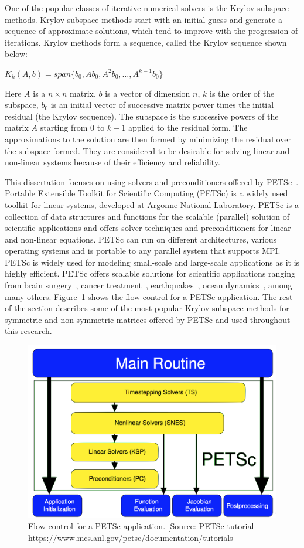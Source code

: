 One of the popular classes of iterative numerical solvers is the Krylov subspace methods. Krylov subspace methods start with an initial guess and generate a sequence of approximate solutions, which tend to improve with the progression of iterations. Krylov methods form a sequence, called the Krylov sequence shown below: 

${K}_{k}(A,b)= span\{b_0,Ab_0,A^{2}b_0,\ldots,A^{k-1}b_0\}$

Here $A$ is a $n \times n$ matrix, $b$ is a vector of dimension $n$, $k$ is the order of the subspace, $b_0$ is an initial vector of successive matrix power times the initial residual (the Krylov sequence). The subspace is the successive powers of the matrix $A$ starting from $0$ to $k-1$ applied to the residual form. The approximations to the solution are then formed by minimizing the residual over the subspace formed. They are considered to be desirable for solving linear and non-linear systems because of their efficiency and reliability. 

This dissertation focuses on using solvers and preconditioners offered by PETSc~\cite{petsc}. Portable Extensible Toolkit for Scientific Computing (PETSc) is a widely used toolkit for linear systems, developed at Argonne National Laboratory. PETSc is a collection of data structures and functions for the scalable (parallel) solution of scientific applications and offers solver techniques and preconditioners for linear and non-linear equations. PETSc can run on different architectures, various operating systems and is portable to any parallel system that supports MPI. PETSc is widely used for modeling small-scale and large-scale applications as it is highly efficient. PETSc offers scalable solutions for scientific applications ranging from brain surgery~\cite{petscapp1}, cancer treatment~\cite{petscapp2}, earthquakes~\cite{petscapp3}, ocean dynamics~\cite{petscapp4}, among many others. Figure~\ref{fig:petscFlow} shows the flow control for a PETSc application. The rest of the section describes some of the most popular Krylov subspace methods for symmetric and non-symmetric matrices offered by PETSc and used throughout this research. 

\begin{figure}
\begin{center}
 \includegraphics[width=0.7\linewidth]{figures/FlowControlForPETScApplication.png}
\end{center}
\caption{Flow control for a PETSc application. [Source: PETSc tutorial https://www.mcs.anl.gov/petsc/documentation/tutorials]\label{fig:petscFlow}}
\end{figure}

